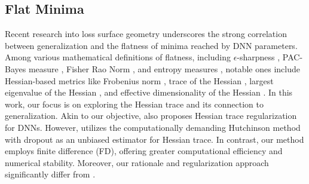 \documentclass[letterpaper]{article} %
\theoremstyle{plain}
\theoremstyle{definition}
\begin{document}
\subsection{Flat Minima}
\label{subsec:flat}
Recent research into loss surface geometry underscores the strong correlation between generalization and the flatness of minima reached by DNN parameters. Among various mathematical definitions of flatness, including $\epsilon$-sharpness \cite{keskar2016large}, PAC-Bayes measure \cite{Jiang2020Fantastic}, Fisher Rao Norm \cite{liang2019fisher}, and entropy measures \cite{pereyra2017regularizing,chaudhari2019entropy}, notable ones include Hessian-based metrics like Frobenius norm \cite{wu2022alignment, wu2022does}, trace of the Hessian \cite{dinh2017sharp}, largest eigenvalue of the Hessian \cite{kaur2023maximum}, and effective dimensionality of the Hessian \cite{maddox2020rethinking}. In this work, our focus is on exploring the Hessian trace and its connection to generalization. Akin to our objective, \cite{LIU202313} also proposes Hessian trace regularization for DNNs. However, \cite{LIU202313} utilizes the computationally demanding Hutchinson method \cite{avron2011randomized} with dropout as an unbiased estimator for Hessian trace. In contrast, our method employs finite difference (FD), offering greater computational efficiency and numerical stability. Moreover, our rationale and regularization approach significantly differ from \cite{LIU202313}.
\end{document}
